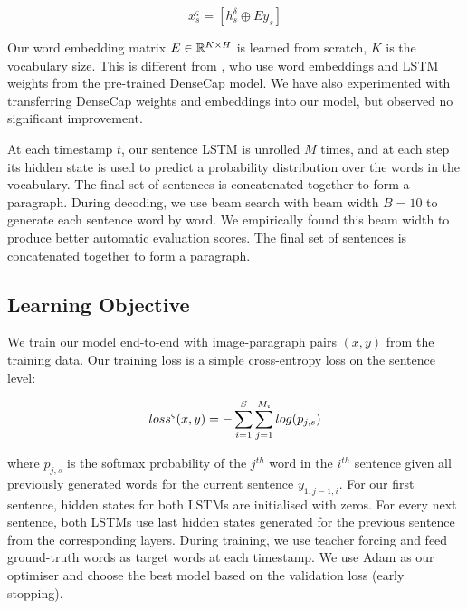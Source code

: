 \documentclass[11pt,a4paper]{article}
\newcommand{\R}{\mathbb{R}}
\begin{document}
\begin{equation}
   x^\varsigma_s = [h^\delta_s \oplus Ey_s ]
\end{equation}


Our word embedding matrix $E \in \R\sp{K \times H}$ is learned from scratch, $K$ is the vocabulary size.
This is different from , who use word embeddings and LSTM weights from the pre-trained DenseCap model. %
We have also experimented with transferring DenseCap weights and embeddings into our model, but observed no significant improvement.

At each timestamp $t$, our sentence LSTM is unrolled $M$ times, and at each step its hidden state is used to predict a probability distribution over the words in the vocabulary.
The final set of sentences is concatenated together to form a paragraph.
During decoding, we use beam search \cite{beam17} with beam width $B = 10$ to generate each sentence word by word.
We empirically found this beam width to produce better automatic evaluation scores.
The final set of sentences is concatenated together to form a paragraph.


\subsection{Learning Objective}
We train our model end-to-end with image-paragraph pairs $(x, y)$ from the training data.
Our training loss is a simple cross-entropy loss on the sentence level:

\begin{equation}
    loss\sp{\varsigma}(x, y) = - \sum_{i=1}^{S}\sum_{j=1}^{M_i} log(p_{j,s})
\end{equation}

where $p_{j,s}$ is the softmax probability of the $j^{th}$ word in the $i^{th}$ sentence given all previously generated words for the current sentence $y_{1:j-1,i}$.
For our first sentence, hidden states for both LSTMs are initialised with zeros.
For every next sentence, both LSTMs use last hidden states generated for the previous sentence from the corresponding layers.
During training, we use teacher forcing and feed ground-truth words as target words at each timestamp.
We use Adam \cite{adam14} as our optimiser and choose the best model based on the validation loss (early stopping).
\end{document}
